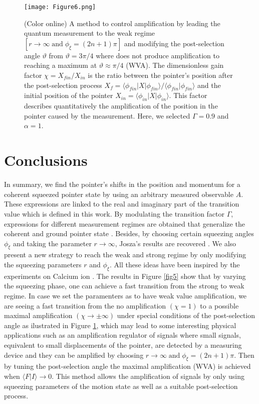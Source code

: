 \documentclass[aps,pra,preprint,superscriptaddress, showpacs]{revtex4-2}
\begin{document}
\begin{figure}[h!]
	\centering
	\texttt{[image: Figure6.png]}
	\caption{(Color online) A method to control amplification by leading the quantum measurement to the weak regime $[r \rightarrow \infty\;\text{and}\; \phi_{\xi}=(2n+1)\pi]$ and modifying the post-selection angle $\vartheta$ from $\vartheta=3\pi/4$ where does not produce amplification to reaching a maximum at $\vartheta\approx \pi/4$ (WVA). The dimensionless gain factor $\chi=X_{fin}/X_{in}$ is the ratio between the pointer's position after the post-selection process $X_{f}=\langle \phi_{fin}|X|\phi_{fin}\rangle/\langle \phi_{fin}|\phi_{fin} \rangle$ and the initial position of the pointer $X_{in}=\langle \phi_{in}|X|\phi_{in} \rangle$. This factor describes quantitatively  the amplification of the position in the pointer caused by the measurement. Here, we selected $\Gamma=0.9$ and $\alpha=1$.}
	\label{fig6}
\end{figure}

\section{Conclusions}

In summary, we find the pointer's shifts in the position and momentum for a coherent squeezed pointer state by using an arbitrary measured observable $A$. These expressions are linked to the real and imaginary part of the transition value which is defined in this work. By modulating the transition factor $\Gamma$, expressions for different measurement regimes are obtained that generalize the coherent and ground pointer state \cite{turek2015advantages,zhu2011quantum}. Besides, by choosing certain squeezing angles $\phi_{\xi}$ and taking the parameter $r\rightarrow \infty$, Josza's results are recovered \cite{jozsa2007complex}. We also present a new strategy to reach the weak and strong regime by only modifying the squeezing parameters $r$ and $\phi_{\xi}$. All these ideas have been inspired by the experiments on Calcium ion \cite{pan2020weak,kienzler2015quantum, drechsler2020state}. The results in Figure \ref{fig5} show that by varying the squeezing phase, one can achieve a fast transition from the strong to weak regime. In case we set the paramenters as to have weak value amplification, we are seeing a fast transition from the no amplification $(\chi=1)$ to a possible maximal amplification $(\chi \rightarrow \pm \infty)$ under special conditions of the post-selection angle as ilustrated in Figure \ref{fig6}, which may lead to some interesting physical applications such as an amplification regulator of signals where small signals, equivalent to small displacements of the pointer, are detected by a measuring device and they can be amplified by choosing $r \rightarrow \infty\;\text{and}\; \phi_{\xi}=(2n+1)\pi$. Then by tuning the post-selection angle the maximal amplification (WVA) is achieved when $\langle  F|I \rangle \rightarrow 0$. This method allows the amplification of signals by only using squeezing parameters of the motion state as well as a suitable post-selection process. 
\end{document}
